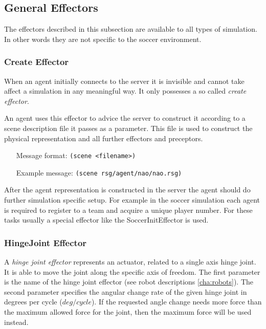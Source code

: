 \subsection{General Effectors}
\label{sec:generaleffectors}
The effectors described in this subsection are available to all types of
simulation. In other words they are not specific to the soccer environment.



\subsubsection{Create Effector}
\label{sec:createeffector}
When an agent initially connects to the server it is invisible and
cannot take affect a simulation in any meaningful way. It only
possesses a so called \emph{create effector}.

An agent uses this effector to advice the server to construct it
according to a scene description file it passes as a parameter. This
file is used to construct the physical representation and all further
effectors and preceptors.

\begin{itemize}
	\item[Message format:] \texttt{(scene  <filename>)}
	\item[Example message:] \texttt{(scene rsg/agent/nao/nao.rsg)}
\end{itemize}

After the agent representation is constructed in the server the agent
should do further simulation specific setup. For example in the soccer
simulation each agent is required to register to a team and acquire a
unique player number. For these tasks usually a special effector like
the SoccerInitEffector is used.



\subsubsection{HingeJoint Effector}
\label{sec:HJE}
A \emph{hinge joint effector} represents an actuator, related to a single axis
hinge joint. It is able to move the joint along the specific axis of freedom.
The first parameter is the name of the hinge joint effector (see robot
descriptions \ref{cha:robots}). The second parameter specifies the angular
change rate of the given hinge joint in degrees per cycle ($deg/cycle$). If the
requested angle change needs more force than the maximum allowed force for the
joint, then the maximum force will be used instead.

